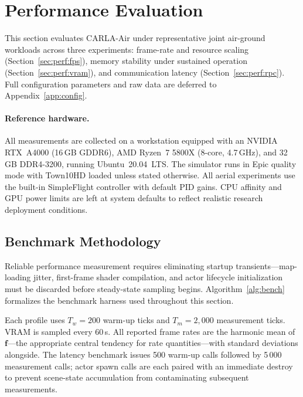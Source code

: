 
\section{Performance Evaluation}
\label{sec:perf}

This section evaluates CARLA-Air under representative joint air-ground
workloads across three experiments: frame-rate and resource scaling
(Section~\ref{sec:perf:fps}), memory stability under sustained operation
(Section~\ref{sec:perf:vram}), and communication latency
(Section~\ref{sec:perf:rpc}).
Full configuration parameters and raw data are deferred to
Appendix~\ref{app:config}.

\paragraph{Reference hardware.}
All measurements are collected on a workstation equipped with an NVIDIA
RTX~A4000 (16\,GB GDDR6), AMD Ryzen~7 5800X (8-core, 4.7\,GHz), and 32\,GB
DDR4-3200, running Ubuntu~20.04~LTS.
The simulator runs in Epic quality mode with Town10HD loaded unless stated
otherwise.
All aerial experiments use the built-in SimpleFlight controller with default
PID gains.
CPU affinity and GPU power limits are left at system defaults to reflect
realistic research deployment conditions.

\subsection{Benchmark Methodology}
\label{sec:perf:method}

Reliable performance measurement requires eliminating startup
transients---map-loading jitter, first-frame shader compilation, and actor
lifecycle initialization must be discarded before steady-state sampling begins.
Algorithm~\ref{alg:bench} formalizes the benchmark harness used throughout this
section.



Each profile uses $T_w = 200$ warm-up ticks and $T_m = 2{,}000$ measurement
ticks.
VRAM is sampled every 60\,s.
All reported frame rates are the harmonic mean of $\mathbf{f}$---the
appropriate central tendency for rate quantities---with standard deviations
alongside.
The latency benchmark issues 500 warm-up calls followed by 5\,000 measurement
calls; actor spawn calls are each paired with an immediate destroy to prevent
scene-state accumulation from contaminating subsequent measurements.

